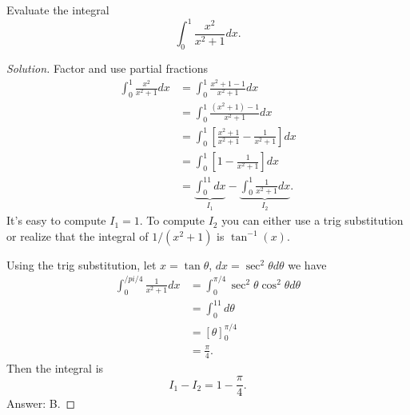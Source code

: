 \begin{problem}
Evaluate the integral
\[
\int_0^1 \frac{x^2}{x^2+1}dx.
\]
\end{problem}
\begin{proof}[Solution]
Factor and use partial fractions
\begin{align*}
\int_0^1 \frac{x^2}{x^2+1}dx
&=\int_0^1\frac{x^2+1-1}{x^2+1}dx\\
&=\int_0^1\frac{\left(x^2+1\right)-1}{x^2+1}dx\\
&=\int_0^1\left[\frac{x^2+1}{x^2+1}-\frac{1}{x^2+1}\right]dx\\
&=\int_0^1\left[1-\frac{1}{x^2+1}\right]dx\\
&=\underbrace{\int_0^11dx}_{I_1}-\underbrace{\int_0^1\frac{1}{x^2+1}dx}_{I_2}.
\end{align*}
It's easy to compute $I_1=1$. To compute $I_2$ you can either use a trig
substitution or realize that the integral of $1/(x^2+1)$ is
$\tan^{-1}(x)$.

Using the trig substitution, let $x=\tan\theta$, $dx=\sec^2\theta d\theta$
we have
\begin{align*}
\int_0^{/pi/4}\frac{1}{x^2+1}dx
&=\int_0^{\pi/4}\sec^2\theta\cos^2\theta d\theta\\
&=\int_0^11d\theta\\
&=\left[\theta\right]_0^{\pi/4}\\
&=\frac{\pi}{4}.
\end{align*}
Then the integral is
\[
I_1-I_2=\boxed{1-\frac{\pi}{4}.}
\]
Answer: {\color{Red} B}.
\end{proof}

